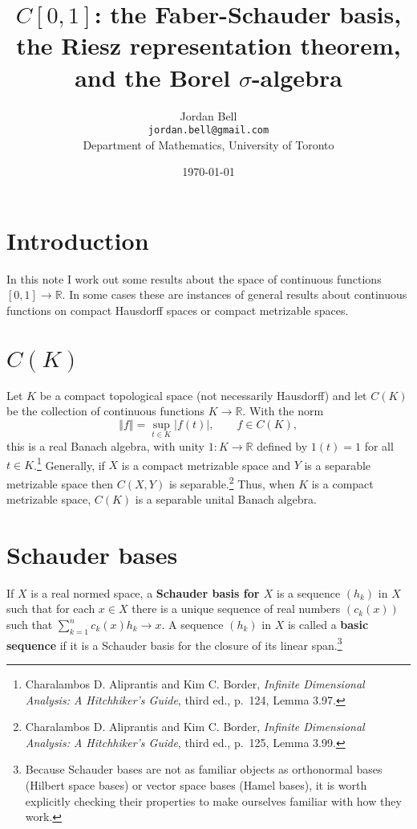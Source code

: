 \documentclass{article}
\newcommand{\norm}[1]{\left\Vert #1 \right\Vert}
\theoremstyle{definition}
\begin{document}
\title{$C[0,1]$: the Faber-Schauder basis,  the Riesz representation theorem, and the  Borel $\sigma$-algebra}
\author{Jordan Bell\\ \texttt{jordan.bell@gmail.com}\\Department of Mathematics, University of Toronto}
\date{\today}

\maketitle

\section{Introduction}
In this note I work out some results about the space of continuous functions $[0,1] \to \mathbb{R}$. 
In some cases these are instances of general results about continuous functions on compact Hausdorff spaces or compact metrizable
spaces. 


\section{$C(K)$}
Let $K$ be a compact topological space (not necessarily Hausdorff) and let $C(K)$ be the collection of continuous functions $K \to \mathbb{R}$.
With the norm
\[
\norm{f} = \sup_{t \in K} |f(t)|,\qquad f \in C(K),
\]
this is a real Banach algebra, with unity $1:K \to \mathbb{R}$ defined by $1(t)=1$ for all $t \in K$.\footnote{Charalambos D. Aliprantis
and Kim C. Border, {\em Infinite Dimensional Analysis: A Hitchhiker's Guide}, third ed., p.~124, Lemma 3.97.}
Generally, if $X$ is a compact metrizable space and 
$Y$ is a separable metrizable space then $C(X,Y)$ is separable.\footnote{Charalambos D. Aliprantis
and Kim C. Border, {\em Infinite Dimensional Analysis: A Hitchhiker's Guide}, third ed., p.~125, Lemma 3.99.}
Thus, when $K$ is a compact metrizable space, $C(K)$ is a separable unital Banach algebra. 


\section{Schauder bases}
If $X$ is a real normed space, a \textbf{Schauder basis for $X$} is a 
sequence $(h_k)$ in $X$ such that for each $x \in X$ there is a unique sequence of real numbers $(c_k(x))$ such that 
$\sum_{k=1}^n c_k(x) h_k \to x$. A sequence $(h_k)$ in $X$ is called a \textbf{basic sequence} if it is a Schauder basis for the closure of
its linear span.\footnote{Because Schauder bases are not as familiar objects as orthonormal bases (Hilbert space
bases) or vector space
bases (Hamel bases), it is worth explicitly checking their properties to make ourselves familiar with how they work.}
\end{document}
